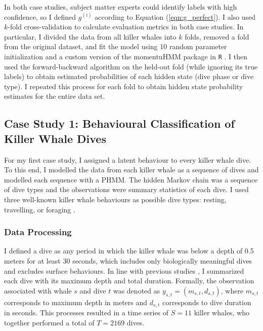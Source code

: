 In both case studies, subject matter experts could identify labels with high confidence, so I defined $g^{(i)}$ according to Equation (\ref{eqn:g_perfect}). I also used $k$-fold cross-validation to calculate evaluation metrics in both case studies. In particular, I divided the data from all killer whales into $k$ folds, removed a fold from the original dataset, and fit the model using 10 random parameter initialization and a custom version of the momentuHMM package in \texttt{R} \citep{McClintock:2018, R:2023}. I then used the forward-backward algorithm on the held-out fold (while ignoring its true labels) to obtain estimated probabilities of each hidden state (dive phase or dive type). I repeated this process for each fold to obtain hidden state probability estimates for the entire data set.

\subsection{Case Study 1: Behavioural Classification of Killer Whale Dives}

For my first case study, I assigned a latent behaviour to every killer whale dive. To this end, I modelled the data from each killer whale as a sequence of dives and modelled each sequence with a PHMM. %
The hidden Markov chain was a sequence of dive types and the observations were summary statistics of each dive. I used three well-known killer whale behaviours as possible dive types: resting, travelling, or foraging \citep{McRae:2024}. 

\subsubsection{Data Processing}

I defined a dive as any period in which the killer whale was below a depth of 0.5 meters for at least 30 seconds, which includes only biologically meaningful dives and excludes surface behaviours. In line with previous studies \citep{Barajas:2017, McRae:2024}, I summarized each dive with its maximum depth and total duration.  Formally, the observation associated with whale $s$ and dive $t$ was denoted as $y_{s,t} = (m_{s,t},d_{s,t})$, where $m_{s,t}$ corresponds to maximum depth in meters and $d_{s,t}$ corresponds to dive duration in seconds. This processes resulted in a time series of $S=11$ killer whales, who together performed a total of $T=2169$ dives.

